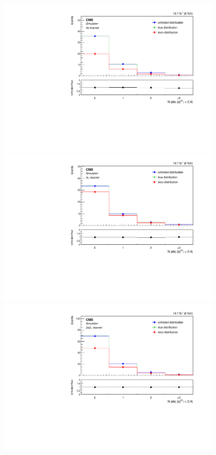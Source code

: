 \begin{figure}[hbtp]
\begin{center}
    \includegraphics[width=0.8\cmsFigWidth]{Figures/Unfolding/MCTests/CentralJets_ZZTo4e_MadMatrix_MadDistr_HalfSample_fr}     
    \includegraphics[width=0.8\cmsFigWidth]{Figures/Unfolding/MCTests/CentralJets_ZZTo4m_MadMatrix_MadDistr_HalfSample_fr}     
    \includegraphics[width=0.8\cmsFigWidth]{Figures/Unfolding/MCTests/CentralJets_ZZTo2e2m_MadMatrix_MadDistr_HalfSample_fr}     

\end{center}
\end{figure}
